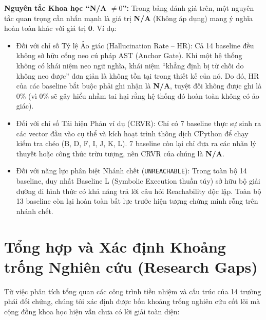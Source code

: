 \noindent\textbf{Nguyên tắc Khoa học ``N/A $\ne 0$'':} 
Trong bảng đánh giá trên, một nguyên tắc quan trọng cần nhấn mạnh là giá trị \textbf{N/A} (Không áp dụng) mang ý nghĩa hoàn toàn khác với giá trị \textbf{0}. Ví dụ: 
\begin{itemize}
    \item Đối với chỉ số Tỷ lệ Ảo giác (Hallucination Rate -- HR): Cả 14 baseline đều không sở hữu cổng neo cú pháp AST (Anchor Gate). Khi một hệ thống không có khái niệm neo ngữ nghĩa, khái niệm ``khẳng định bị từ chối do không neo được'' đơn giản là không tồn tại trong thiết kế của nó. Do đó, HR của các baseline bắt buộc phải ghi nhận là \textbf{N/A}, tuyệt đối không được ghi là 0\% (vì 0\% sẽ gây hiểu nhầm tai hại rằng hệ thống đó hoàn toàn không có ảo giác).
    \item Đối với chỉ số Tái hiện Phản ví dụ (CRVR): Chỉ có 7 baseline thực sự sinh ra các vector đầu vào cụ thể và kích hoạt trình thông dịch CPython để chạy kiểm tra chéo (B, D, F, I, J, K, L). 7 baseline còn lại chỉ đưa ra các nhãn lý thuyết hoặc công thức trừu tượng, nên CRVR của chúng là \textbf{N/A}.
    \item Đối với năng lực phân biệt Nhánh chết (\texttt{UNREACHABLE}): Trong toàn bộ 14 baseline, duy nhất Baseline L (Symbolic Execution thuần túy) sở hữu bộ giải đường đi hình thức có khả năng trả lời câu hỏi Reachability độc lập. Toàn bộ 13 baseline còn lại hoàn toàn bất lực trước hiện tượng chứng minh rỗng trên nhánh chết.
\end{itemize}

\section{Tổng hợp và Xác định Khoảng trống Nghiên cứu (Research Gaps)}
\label{sec:research_gaps}

Từ việc phân tích tổng quan các công trình tiền nhiệm và cấu trúc của 14 trường phái đối chứng, chúng tôi xác định được bốn khoảng trống nghiên cứu cốt lõi mà cộng đồng khoa học hiện vẫn chưa có lời giải toàn diện:

